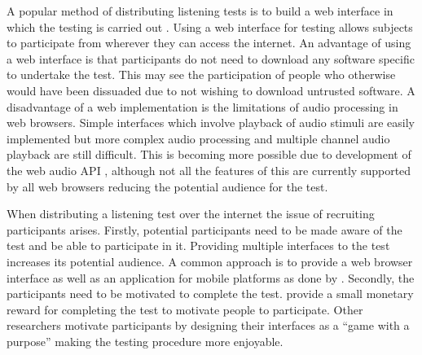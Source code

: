 			A popular method of distributing listening tests is to build a web interface in which the testing
			is carried out \citep{wilmering2013audio, cartwright2013socialeq, seetharaman2014crowdsourcing}.
			Using a web interface for testing allows subjects to participate from wherever they can access the
			internet. An advantage of using a web interface is that participants do not need to download any
			software specific to undertake the test. This may see the participation of people who otherwise
			would have been dissuaded due to not wishing to download untrusted software. A disadvantage of a
			web implementation is the limitations of audio processing in web browsers. Simple interfaces which
			involve playback of audio stimuli are easily implemented but more complex audio processing and
			multiple channel audio playback are still difficult. This is becoming more possible due to
			development of the web audio API \citep{adenot2015web}, although not all the features of this are
			currently supported by all web browsers reducing the potential audience for the test.

			When distributing a listening test over the internet the issue of recruiting participants arises.
			Firstly, potential participants need to be made aware of the test and be able to participate in it.
			Providing multiple interfaces to the test increases its potential audience. A common approach is to
			provide a web browser interface as well as an application for mobile platforms as done by
			\citet{huq2010crowdsourcing}. Secondly, the participants need to be motivated to complete the test.
			\citet{cartwright2013socialeq} provide a small monetary reward for completing the test to motivate
			people to participate. Other researchers motivate participants by designing their interfaces as a
			``game with a purpose'' \citep{law2007tagatune, huq2010crowdsourcing, burgoyne2013hooked} making
			the testing procedure more enjoyable.

